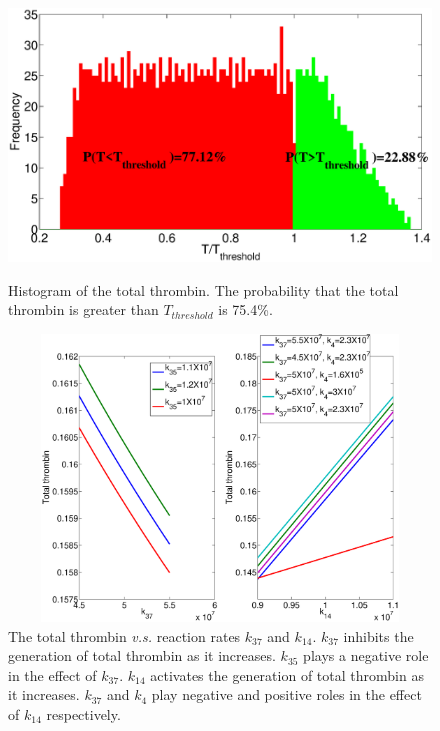 \begin{figure}
  \begin{center}
  \includegraphics[width=5in]{figures/F89hist.eps}
\caption{Histogram of the total thrombin. The probability that the
total thrombin is greater than $T_{threshold}$ is
75.4\%.}\label{Fig:F89hist}

  \includegraphics[width=5in,height=3in]{figures/rv.eps}
\caption{The total thrombin \textit{v.s.} reaction rates $k_{37}$
and $k_{14}$. $k_{37}$ inhibits the generation of total thrombin as
it increases. $k_{35}$ plays a negative role in the effect of
$k_{37}$. $k_{14}$ activates the generation of total thrombin as it
increases. $k_{37}$ and $k_4$ play negative and positive roles in
the effect of $k_{14}$ respectively.}\label{Fig:RV}

  \end{center}
\end{figure}
\clearpage


